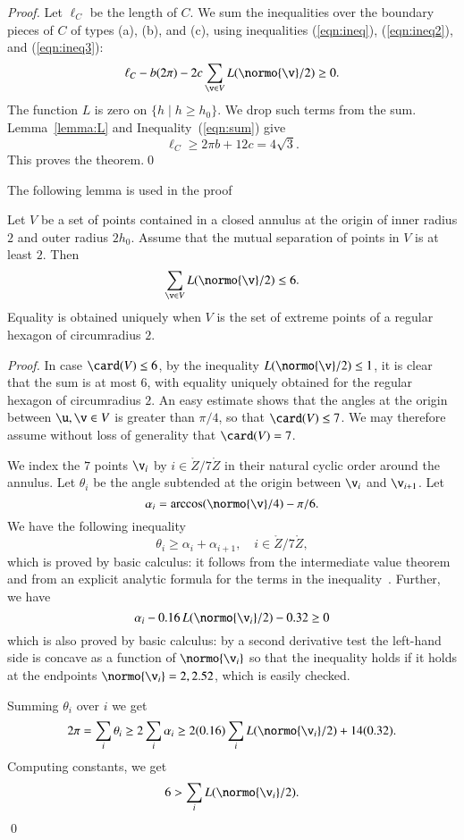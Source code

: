 \documentclass{llncs}
\begin{document}
\begin{proof}
Let $\ell_C$ be the length of $C$.  We sum the inequalities over the
boundary pieces of $C$ of types (a), (b), and (c), using inequalities
(\ref{eqn:ineq}), (\ref{eqn:ineq2}), and (\ref{eqn:ineq3}):
\begin{equation}\label{eqn:sum}
\ell_C - b (2\pi) - 2 c \sum_{\v\in V} L(\normo{\v}/2) \ge 0.
\end{equation}
The function $L$ is zero on $\{h \mid h\ge h_0\}$.  We drop such terms
from the sum.  Lemma~\ref{lemma:L} and Inequality~(\ref{eqn:sum}) give
\[
\ell_C \ge 2 \pi b + 12 c = 4\sqrt3.
\]
This proves the theorem.\qed
\end{proof}

The following lemma is used in the proof

\begin{lemma}\label{lemma:L}
  Let $V$ be a set of points contained in a closed annulus at the
  origin of inner radius $2$ and outer radius $2h_0$.  Assume that
  the mutual separation of points in $V$ is at least $2$.  Then
\[
\sum_{\v\in V} L(\normo{\v}/2) \le 6.
\]
Equality is obtained uniquely when $V$ is the set of extreme points of
a regular hexagon of circumradius $2$.
\end{lemma}

\begin{proof}
  In case $\card(V)\le 6$, by the inequality $L(\normo{\v}/2)\le 1$,
  it is clear that the sum is at most $6$, with equality uniquely
  obtained for the regular hexagon of circumradius $2$.  An easy
  estimate shows that the angles at the origin between $\u,\v\in V$ is
  greater than $\pi/4$, so that $\card(V)\le 7$.  We may therefore
  assume without loss of generality that $\card(V)=7$.

We index the $7$ points $\v_i$ by $i\in\ring{Z}/7\ring{Z}$ in their
natural cyclic order around the annulus.  Let $\theta_i$ be the angle
subtended at the origin between $\v_i$ and $\v_{i+1}$.  Let 
\[
\alpha_i = \arccos(\normo{\v}/4) - \pi/6.
\]
We have the following inequality
\begin{equation}\label{eqn:theta-alpha}
\theta_i \ge \alpha_i + \alpha_{i+1},\quad i\in \ring{Z}/7\ring{Z},
\end{equation}
which is proved by basic calculus: it follows from the intermediate
value theorem and from an explicit analytic formula for the terms in
the inequality~\cite[Lemma~6.107]{DSP}.
Further, we have
\begin{equation}\label{eqn:alpha}
  \alpha_i - 0.16\, L(\normo{\v_i}/2) - 0.32 \ge0
\end{equation}
which is also proved by basic calculus: by a second derivative test
the left-hand side is concave as a function of $\normo{\v_i}$ so that
the inequality holds if it holds at the endpoints
$\normo{\v_i}=2,2.52$, which is easily checked.

Summing $\theta_i$ over $i$ we get
\[
2\pi  = \sum_i \theta_i \ge 
2\sum_i \alpha_i \ge 2 (0.16) \sum_i L(\normo{\v_i}/2) + 14 (0.32).
\]
Computing constants, we get
\[
6 > \sum_i L(\normo{\v_i}/2).
\]
\qed
\end{proof}
\end{document}
